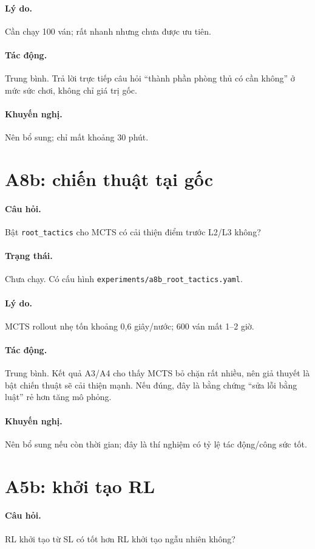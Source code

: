 \paragraph{Lý do.} Cần chạy 100 ván; rất nhanh nhưng chưa được ưu tiên.
\paragraph{Tác động.} Trung bình. Trả lời trực tiếp câu hỏi ``thành phần phòng thủ có cần không''
ở mức sức chơi, không chỉ giá trị gốc.
\paragraph{Khuyến nghị.} Nên bổ sung; chỉ mất khoảng 30 phút.

\section{A8b: chiến thuật tại gốc}
\paragraph{Câu hỏi.} Bật \texttt{root\_tactics} cho MCTS có cải thiện điểm trước L2/L3 không?
\paragraph{Trạng thái.} Chưa chạy. Có cấu hình \texttt{experiments/a8b\_root\_tactics.yaml}.
\paragraph{Lý do.} MCTS rollout nhẹ tốn khoảng 0,6 giây/nước; 600 ván mất 1--2 giờ.
\paragraph{Tác động.} Trung bình. Kết quả A3/A4 cho thấy MCTS bỏ chặn rất nhiều, nên giả thuyết
là bật chiến thuật sẽ cải thiện mạnh. Nếu đúng, đây là bằng chứng ``sửa lỗi bằng luật'' rẻ hơn
tăng mô phỏng.
\paragraph{Khuyến nghị.} Nên bổ sung nếu còn thời gian; đây là thí nghiệm có tỷ lệ tác động/công
sức tốt.

\section{A5b: khởi tạo RL}
\paragraph{Câu hỏi.} RL khởi tạo từ SL có tốt hơn RL khởi tạo ngẫu nhiên không?
